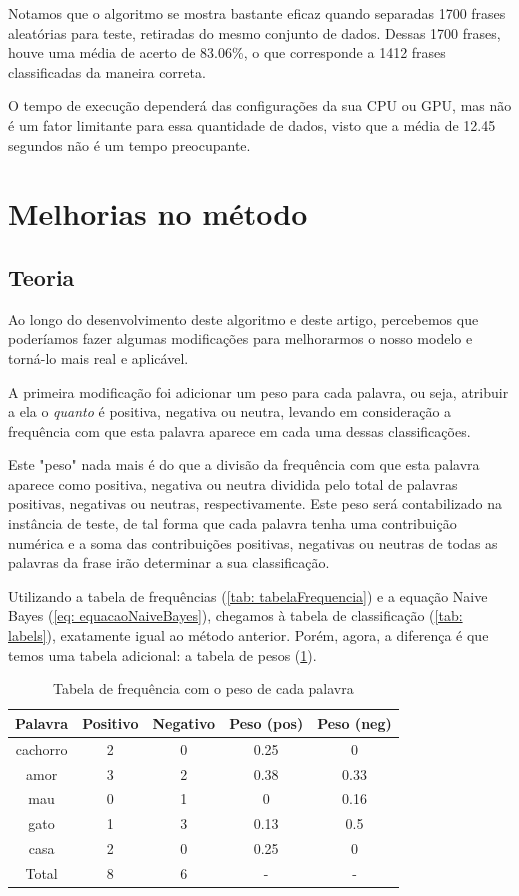 \documentclass[
article,			%
12pt,				%
a4paper,			%
english,			%
brazil,				%
sumario=tradicional,
twoside
]{abntex2}
\begin{document}
		Notamos que o algoritmo se mostra bastante eficaz quando separadas 1700 frases aleatórias para teste, retiradas do mesmo conjunto de dados. Dessas 1700 frases, houve uma média de acerto de 83.06\%, o que corresponde a 1412 frases classificadas da maneira correta.
		
		O tempo de execução dependerá das configurações da sua CPU ou GPU, mas não é um fator limitante para essa quantidade de dados, visto que a média de 12.45 segundos não é um tempo preocupante.
		
		
	\section{Melhorias no método}
	\label{melhorias}
	\subsection{Teoria}
	Ao longo do desenvolvimento deste algoritmo e deste artigo, percebemos que poderíamos fazer algumas modificações para melhorarmos o nosso modelo e torná-lo mais real e aplicável.
	
	A primeira modificação foi adicionar um peso para cada palavra, ou seja, atribuir a ela o \emph{quanto} é positiva, negativa ou neutra, levando em consideração a frequência com que esta palavra aparece em cada uma dessas classificações. 
	
	Este "peso"  nada mais é do que a divisão da frequência com que esta palavra aparece como positiva, negativa ou neutra dividida pelo total de palavras positivas, negativas ou neutras, respectivamente. Este peso será contabilizado na instância de teste, de tal forma que cada palavra tenha uma contribuição numérica e a soma das contribuições positivas, negativas ou neutras de todas as palavras da frase irão determinar a sua classificação.
	
	
	Utilizando a tabela de frequências (\ref{tab: tabelaFrequencia}) e a equação Naive Bayes (\ref{eq: equacaoNaiveBayes}), chegamos à tabela de classificação (\ref{tab: labels}), exatamente igual ao método anterior. Porém, agora, a diferença é que temos uma tabela adicional: a tabela de pesos (\ref{tab: tabfreq2}).
 
	\begin{table}[!h]
		\caption{Tabela de frequência com o peso de cada palavra}
		\label{tab: tabfreq2}
		\centering
		
		\begin{tabular}{|c|c|c|c|c|} \hline
			\textbf{Palavra} & \textbf{Positivo} & \textbf{Negativo} & \textbf{Peso (pos)} & \textbf{Peso (neg)}\\
			\hline
			cachorro & 2 & 0 & 0.25 & 0\\
			amor & 3 & 2 & 0.38 & 0.33\\
			mau & 0 & 1 & 0 & 0.16\\
			gato & 1 & 3 & 0.13 & 0.5\\
			casa & 2 & 0 & 0.25 & 0\\
			\hline
			Total & 8 & 6  & - & - \\
			\hline
			
		\end{tabular}
	\end{table}
\end{document}
